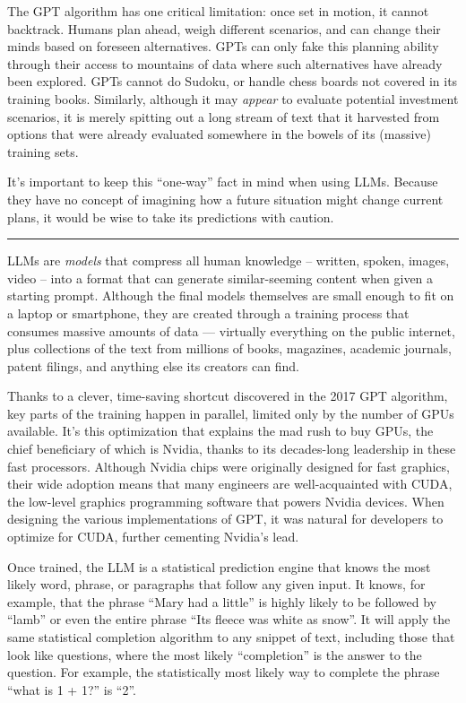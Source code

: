 \documentclass[
  Letterpaper,
]{scrbook}
\begin{document}
The GPT algorithm has one critical limitation: once set in motion, it
cannot backtrack. Humans plan ahead, weigh different scenarios, and can
change their minds based on foreseen alternatives. GPTs can only fake
this planning ability through their access to mountains of data where
such alternatives have already been explored. GPTs cannot do Sudoku, or
handle chess boards not covered in its training books. Similarly,
although it may \emph{appear} to evaluate potential investment
scenarios, it is merely spitting out a long stream of text that it
harvested from options that were already evaluated somewhere in the
bowels of its (massive) training sets.

It's important to keep this ``one-way'' fact in mind when using LLMs.
Because they have no concept of imagining how a future situation might
change current plans, it would be wise to take its predictions with
caution.

\begin{center}\rule{0.5\linewidth}{0.5pt}\end{center}

LLMs are \emph{models} that compress all human knowledge -- written,
spoken, images, video -- into a format that can generate similar-seeming
content when given a starting prompt. Although the final models
themselves are small enough to fit on a laptop or smartphone, they are
created through a training process that consumes massive amounts of data
--- virtually everything on the public internet, plus collections of the
text from millions of books, magazines, academic journals, patent
filings, and anything else its creators can find.

Thanks to a clever, time-saving shortcut discovered in the 2017 GPT
algorithm, key parts of the training happen in parallel, limited only by
the number of GPUs available. It's this optimization that explains the
mad rush to buy GPUs, the chief beneficiary of which is Nvidia, thanks
to its decades-long leadership in these fast processors. Although Nvidia
chips were originally designed for fast graphics, their wide adoption
means that many engineers are well-acquainted with CUDA, the low-level
graphics programming software that powers Nvidia devices. When designing
the various implementations of GPT, it was natural for developers to
optimize for CUDA, further cementing Nvidia's lead.

Once trained, the LLM is a statistical prediction engine that knows the
most likely word, phrase, or paragraphs that follow any given input. It
knows, for example, that the phrase ``Mary had a little'' is highly
likely to be followed by ``lamb'' or even the entire phrase ``Its fleece
was white as snow''. It will apply the same statistical completion
algorithm to any snippet of text, including those that look like
questions, where the most likely ``completion'' is the answer to the
question. For example, the statistically most likely way to complete the
phrase ``what is 1 + 1?'' is ``2''.
\end{document}
